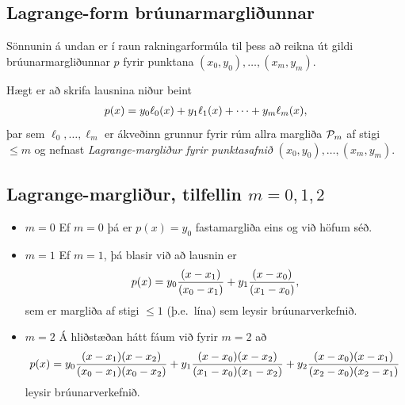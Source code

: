 \documentclass[A4paper,10pt,icelandic]{sphinxmanual}
\begin{document}

\subsection{Lagrange-form brúunarmargliðunnar}
\label{kafli03:index-7}\label{kafli03:lagrange-form-bruunarmargliunnar}
Sönnunin á undan er í raun rakningarformúla til þess að reikna út gildi
brúunarmargliðunnar \(p\) fyrir punktana
\((x_0,y_0),\dots,(x_m,y_m)\).

Hægt er að skrifa lausnina niður beint
\begin{gather}
\begin{split}p(x)=y_0\ell_0(x)+y_1\ell_1(x)+\cdots+y_m\ell_m(x),\end{split}\notag
\end{gather}
þar sem \(\ell_0,\dots,\ell_m\) er ákveðinn grunnur fyrir rúm allra
margliða \({\cal P}_m\) af stigi \(\leq m\) og nefnast
\emph{Lagrange-margliður fyrir punktasafnið}
\((x_0,y_0),\dots,(x_m,y_m)\).


\subsection{Lagrange-margliður, tilfellin \(m=0,1,2\)}
\label{kafli03:lagrange-margliur-tilfellin}\begin{itemize}
\item {} 
\(m=0\) Ef \(m = 0\) þá er \(p(x) = y_0\) fastamargliða
eins og við höfum séð.

\item {} 
\(m=1\) Ef \(m = 1\), þá blasir við að lausnin er
\begin{gather}
\begin{split}p(x) = y_0 \frac{(x-x_1)}{(x_0-x_1)}
  + y_1 \frac{(x-x_0)}{(x_1-x_0)},\end{split}\notag
\end{gather}
sem er margliða af stigi \(\leq 1\) (þ.e. lína) sem leysir
brúunarverkefnið.

\item {} 
\(m=2\) Á hliðstæðan hátt fáum við fyrir \(m = 2\) að
\begin{gather}
\begin{split}p(x) = y_0 \frac{(x-x_1)(x-x_2)}{(x_0-x_1)(x_0-x_2)}
  + y_1 \frac{(x-x_0)(x-x_2)}{(x_1-x_0)(x_1-x_2)}
  + y_2 \frac{(x-x_0)(x-x_1)}{(x_2-x_0)(x_2-x_1)}\end{split}\notag
\end{gather}
leysir brúunarverkefnið.

\end{itemize}
\end{document}
